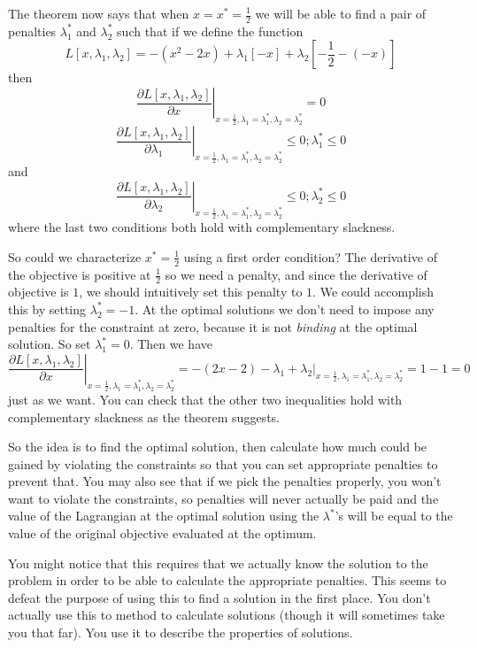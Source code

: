 \documentclass{article}
\begin{document}
The theorem now says that when $x=x^{\ast}=\frac{1}{2}$ we will be able to
find a pair of penalties $\lambda_{1}^{\ast}$ and $\lambda_{2}^{\ast}$ such
that if we define the function
\[
L\left[  x,\lambda_{1},\lambda_{2}\right]  =-\left(  x^{2}-2x\right)
+\lambda_{1}\left[  -x\right]  +\lambda_{2}\left[  -\frac{1}{2}-\left(
-x\right)  \right]
\]
then%
\[
\left.  \frac{\partial L\left[  x,\lambda_{1},\lambda_{2}\right]  }{\partial
x}\right|  _{x=\frac{1}{2},\lambda_{1}=\lambda_{1}^{\ast},\lambda_{2}%
=\lambda_{2}^{\ast}}=0
\]%
\[
\left.  \frac{\partial L\left[  x,\lambda_{1},\lambda_{2}\right]  }%
{\partial\lambda_{1}}\right|  _{x=\frac{1}{2},\lambda_{1}=\lambda_{1}^{\ast
},\lambda_{2}=\lambda_{2}^{\ast}}\leq0;\lambda_{1}^{\ast}\leq0
\]
and%
\[
\left.  \frac{\partial L\left[  x,\lambda_{1},\lambda_{2}\right]  }%
{\partial\lambda_{2}}\right|  _{x=\frac{1}{2},\lambda_{1}=\lambda_{1}^{\ast
},\lambda_{2}=\lambda_{2}^{\ast}}\leq0;\lambda_{2}^{\ast}\leq0
\]
where the last two conditions both hold with complementary slackness.

So could we characterize $x^{\ast}=\frac{1}{2}$ using a first order condition?
The derivative of the objective is positive at $\frac{1}{2}$ so we need a
penalty, and since the derivative of objective is $1$, we should intuitively
set this penalty to $1$. We could accomplish this by setting $\lambda
_{2}^{\ast}=-1$. At the optimal solutions we don't need to impose any
penalties for the constraint at zero, because it is not \emph{binding} at the
optimal solution. So set $\lambda_{1}^{\ast}=0$. Then we have%
\[
\left.  \frac{\partial L\left[  x,\lambda_{1},\lambda_{2}\right]  }{\partial
x}\right|  _{x=\frac{1}{2},\lambda_{1}=\lambda_{1}^{\ast},\lambda_{2}%
=\lambda_{2}^{\ast}}=\left.  -\left(  2x-2\right) -\lambda_{1} +\lambda_{2}\right|
_{x=\frac{1}{2},\lambda_{1}=\lambda_{1}^{\ast},\lambda_{2}=\lambda_{2}^{\ast}%
}=1-1=0
\]
just as we want. You can check that the other two inequalities hold with
complementary slackness as the theorem suggests.

So the idea is to find the optimal solution, then calculate how much could be
gained by violating the constraints so that you can set appropriate penalties
to prevent that. You may also see that if we pick the penalties properly, you
won't want to violate the constraints, so penalties will never actually be
paid and the value of the Lagrangian at the optimal solution using the
$\lambda^{\ast}$'s will be equal to the value of the original objective
evaluated at the optimum.

You might notice that this requires that we actually know the solution to the
problem in order to be able to calculate the appropriate penalties. This seems
to defeat the purpose of using this to find a solution in the first place. You
don't actually use this to method to calculate solutions (though it will
sometimes take you that far). You use it to describe the properties of solutions.
\end{document}
